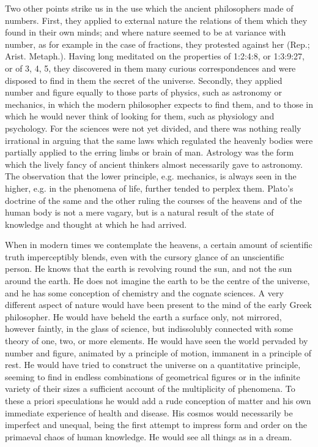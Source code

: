 Two other points strike us in the use which the ancient philosophers made
of numbers. First, they applied to external nature the relations of them
which they found in their own minds; and where nature seemed to be at
variance with number, as for example in the case of fractions, they
protested against her (Rep.; Arist. Metaph.). Having long meditated on the
properties of 1:2:4:8, or 1:3:9:27, or of 3, 4, 5, they discovered in them
many curious correspondences and were disposed to find in them the secret
of the universe. Secondly, they applied number and figure equally to those
parts of physics, such as astronomy or mechanics, in which the modern
philosopher expects to find them, and to those in which he would never
think of looking for them, such as physiology and psychology. For the
sciences were not yet divided, and there was nothing really irrational in
arguing that the same laws which regulated the heavenly bodies were
partially applied to the erring limbs or brain of man. Astrology was the
form which the lively fancy of ancient thinkers almost necessarily gave to
astronomy. The observation that the lower principle, e.g. mechanics, is
always seen in the higher, e.g. in the phenomena of life, further tended
to perplex them. Plato’s doctrine of the same and the other ruling the
courses of the heavens and of the human body is not a mere vagary, but is
a natural result of the state of knowledge and thought at which he had
arrived.

When in modern times we contemplate the heavens, a certain amount of
scientific truth imperceptibly blends, even with the cursory glance of an
unscientific person. He knows that the earth is revolving round the sun,
and not the sun around the earth. He does not imagine the earth to be the
centre of the universe, and he has some conception of chemistry and the
cognate sciences. A very different aspect of nature would have been
present to the mind of the early Greek philosopher. He would have beheld
the earth a surface only, not mirrored, however faintly, in the glass of
science, but indissolubly connected with some theory of one, two, or more
elements. He would have seen the world pervaded by number and figure,
animated by a principle of motion, immanent in a principle of rest. He
would have tried to construct the universe on a quantitative principle,
seeming to find in endless combinations of geometrical figures or in the
infinite variety of their sizes a sufficient account of the multiplicity
of phenomena. To these a priori speculations he would add a rude
conception of matter and his own immediate experience of health and
disease. His cosmos would necessarily be imperfect and unequal, being the
first attempt to impress form and order on the primaeval chaos of human
knowledge. He would see all things as in a dream.


